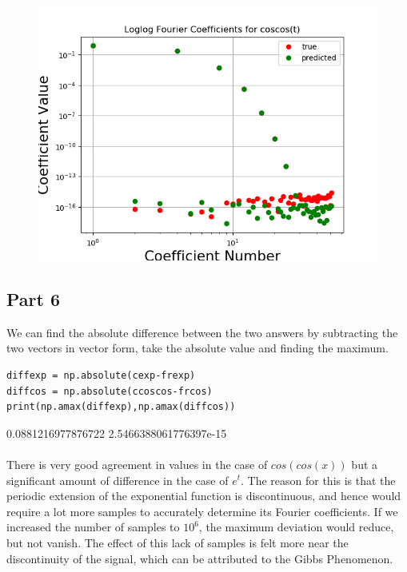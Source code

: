 \documentclass[11pt, a4paper]{article}
\begin{document}
\begin{figure}[!tbh]
   	\centering
   	\includegraphics[scale=0.5]{Figure_62.png}
   	\label{fig:62}
   \end{figure}

\subsection{Part 6}
We can find the absolute difference between the two answers by subtracting the two vectors in vector form, take the absolute value and finding the maximum.
\begin{verbatim}
diffexp = np.absolute(cexp-frexp)
diffcos = np.absolute(ccoscos-frcos)
print(np.amax(diffexp),np.amax(diffcos))
\end{verbatim}
{0.0881216977876722 2.5466388061776397e-15
}
\\
\\
{There is very good agreement in values in the case of $cos(cos(x))$ but a significant amount of difference in the case of $e^{t}$. The reason for this is that the periodic extension of the exponential function is discontinuous, and hence would require a lot more samples to accurately determine its Fourier coefficients. If we increased the number of samples to $10^{6}$, the maximum deviation would reduce, but not vanish.
The effect of this lack of samples is felt more near the discontinuity of the signal, which can be attributed to the Gibbs Phenomenon.
}
\end{document}
